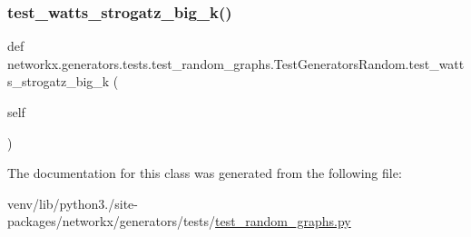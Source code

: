 \subsubsection{\texorpdfstring{test\+\_\+watts\+\_\+strogatz\+\_\+big\+\_\+k()}{test\_watts\_strogatz\_big\_k()}}
{\footnotesize\ttfamily def networkx.\+generators.\+tests.\+test\+\_\+random\+\_\+graphs.\+Test\+Generators\+Random.\+test\+\_\+watts\+\_\+strogatz\+\_\+big\+\_\+k (\begin{DoxyParamCaption}\item[{}]{self }\end{DoxyParamCaption})}



The documentation for this class was generated from the following file\+:\begin{DoxyCompactItemize}
\item 
venv/lib/python3./site-\/packages/networkx/generators/tests/\hyperlink{test__random__graphs_8py}{test\+\_\+random\+\_\+graphs.\+py}\end{DoxyCompactItemize}
